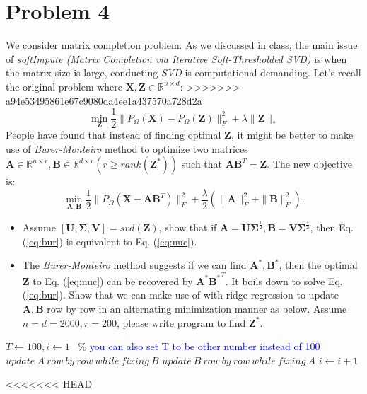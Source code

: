 \documentclass[11pt]{article}
\newcommand{\mtx}[1]{\mathbf{#1}}
\def \mA {\mtx{A}}
\def \mB {\mtx{B}}
\def \mU {\mtx{U}}
\def \mV {\mtx{V}}
\def \mSigma {\mtx{\Sigma}}
\def \mX {\mtx{X}}
\def \mZ {\mtx{Z}}
\begin{document}
	\section*{Problem 4}
	We consider matrix completion problem. As we discussed in class, the main issue of \textit{softImpute (Matrix Completion via Iterative Soft-Thresholded SVD)} is when the matrix size is large, conducting \textit{SVD} is computational demanding. Let's recall the original problem where $\mX, \mZ \in\mathbb{R}^{n\times d}$: 
>>>>>>> a94e53495861e67c9080da4ee1a437570a728d2a
	\begin{equation}\label{eq:nuc}
	\min\limits_{\mZ}\frac{1}{2}\|P_\Omega(\mX)-P_\Omega(\mZ)\|_F^2+\lambda \|\mZ\|_*
	\end{equation} 
People have found that instead of finding optimal $\mZ$, it might be better to make use of \textit{Burer-Monteiro} method to optimize two matrices $\mA \in\mathbb{R}^{n\times r}, \mB\in\mathbb{R}^{d\times r} (r\ge rank(\mZ^*))$ such that $\mA\mB^T=\mZ$. The new objective is:
	\begin{equation}\label{eq:bur}
	\min\limits_{\mA,\mB}\frac{1}{2}\|P_\Omega(\mX-\mA\mB^T)\|_F^2+\frac{\lambda}{2}(\|\mA\|_F^2+\|\mB\|^2_F).
\end{equation} 
\begin{itemize}
	\item Assume $[\mU,\mSigma,\mV]=svd(\mZ)$, show that if $\mA=\mU\mSigma^\frac{1}{2}, \mB=\mV\mSigma^\frac{1}{2}$, then Eq. (\ref{eq:bur}) is equivalent to Eq. (\ref{eq:nuc}).
	\item The \textit{Burer-Monteiro} method suggests if we can find  $\mA^*,\mB^*$, then the optimal $\mZ$ to Eq. (\ref{eq:nuc}) can be recovered by $\mA^*{\mB^*}^T$. It boils down to solve Eq. (\ref{eq:bur}). Show that we can make use of  with ridge regression to update $\mA, \mB$ row by row in an alternating minimization manner as below. Assume $n=d=2000, r=200$, please write program to find $\mZ^*$.
\end{itemize}
\begin{algorithmic}
	\State $T \gets 100, i\gets 1$ \ \% \textcolor{blue}{you can also set T to be other number instead of 100}
	\State $update \ A \ row \ by \ row \ while \ fixing \ B$
	\State $update \ B \ row \ by \ row \ while \ fixing \ A$
	\State $i \gets i+1$
	\EndIf 
\end{algorithmic}
<<<<<<< HEAD
\end{document}
